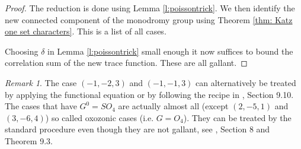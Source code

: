 \documentclass[12pt]{amsart}
\theoremstyle{plain}
\theoremstyle{definition}
\theoremstyle{remark}
\newtheorem{rem}[thm]{Remark}
\numberwithin{equation}{section}
\begin{document}
\begin{proof}
The reduction is done using Lemma \ref{l:poissontrick}. We then identify the new connected component of the monodromy group using Theorem \ref{thm: Katz one set characters}. This is a list of all cases.   

    \vspace{15pt}
    
Choosing $\delta$ in Lemma \ref{l:poissontrick} small enough it now suffices to bound the correlation sum of the new trace function. These are all gallant. \qedhere
\end{proof}
\begin{rem}
    The case $(-1,-2,3)$ and $(-1,-1,3)$ can alternatively be treated by applying the functional equation or by following the recipe in \cite{FKMSbilinear}, Section 9.10. 
    The cases that have $G^0=SO_4$ are actually almost all (except $(2,-5,1)$ and $(3,-6,4)$) so called oxozonic cases (i.e. $G=O_4$). They can be treated by the standard procedure even though they are not gallant, see \cite{FKMSbilinear}, Section 8 and Theorem 9.3.
\end{rem}
\end{document}
